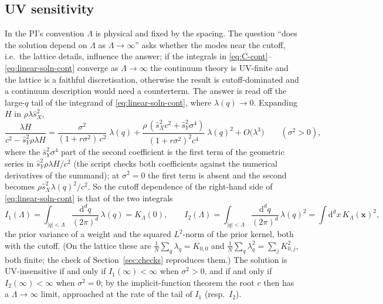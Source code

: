\documentclass[11pt,a4paper]{article}
\newcommand{\dd}{\mathrm d}
\newcommand{\Lam}{\Lambda}
\newcommand{\sX}{\hat s_X}
\newcommand{\sY}{\hat s_Y}
\newcommand{\ball}[1]{\int_{|q|<\Lam}\frac{\dd^d q}{(2\pi)^d}\,#1}
\begin{document}
\subsection{UV sensitivity}
\label{sec:uv}
In the PI's convention $\Lam$ is physical and fixed by the spacing. The question ``does the solution depend on $\Lam$ as $\Lam\to\infty$'' asks whether the modes near the cutoff, i.e.\ the lattice details, influence the answer; if the integrals in \eqref{eq:C-cont}--\eqref{eq:linear-soln-cont} converge as $\Lam\to\infty$ the continuum theory is UV-finite and the lattice is a faithful discretisation, otherwise the result is cutoff-dominated and a continuum description would need a counterterm. The answer is read off the large-$q$ tail of the integrand of \eqref{eq:linear-soln-cont}, where $\lambda(q)\to0$. Expanding $H$ in $\rho\lambda\sX^2$,
\begin{equation}
  \frac{\lambda H}{c^2-\sY^2\rho\lambda H}
  = \frac{\sigma^2}{(1+r\sigma^2)\,c^2}\;\lambda(q)
  + \frac{\rho\,(\sX^2c^2 + \sY^2\sigma^4)}{(1+r\sigma^2)^2c^4}\;\lambda(q)^2
  + O\big(\lambda^3\big)\qquad(\sigma^2>0),
  \label{eq:tail}
\end{equation}
where the $\sY^2\sigma^4$ part of the second coefficient is the first term of the geometric series in $\sY^2\rho\lambda H/c^2$ (the script checks both coefficients against the numerical derivatives of the summand); at $\sigma^2 = 0$ the first term is absent and the second becomes $\rho\sX^2\lambda(q)^2/c^2$. So the cutoff dependence of the right-hand side of \eqref{eq:linear-soln-cont} is that of the two integrals
\begin{equation}
  I_1(\Lam) = \ball{\lambda(q)} = K_{\Lam}(0),
  \qquad
  I_2(\Lam) = \ball{\lambda(q)^2} = \int\dd^dx\,K_{\Lam}(\mathbf x)^2,
  \label{eq:I12}
\end{equation}
the prior variance of a weight and the squared $L^2$-norm of the prior kernel, both with the cutoff. (On the lattice these are $\frac1N\sum_q\lambda_q = K_{0,0}$ and $\frac1N\sum_q\lambda_q^2 = \sum_jK_{0,j}^2$, both finite; the check of Section~\ref{sec:checks} reproduces them.) The solution is UV-insensitive if and only if $I_1(\infty)<\infty$ when $\sigma^2>0$, and if and only if $I_2(\infty)<\infty$ when $\sigma^2 = 0$; by the implicit-function theorem the root $c$ then has a $\Lam\to\infty$ limit, approached at the rate of the tail of $I_1$ (resp.\ $I_2$).
\end{document}
